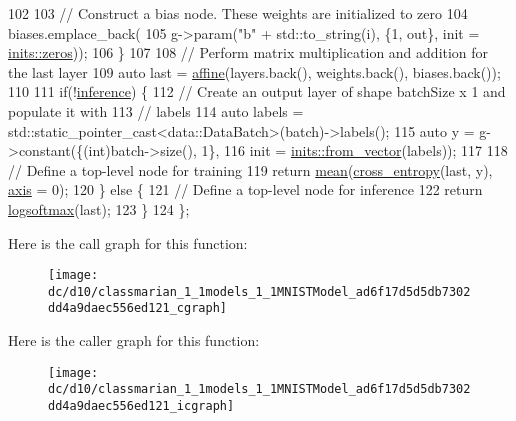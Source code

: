 \begin{DoxyCode}
102 
103       \textcolor{comment}{// Construct a bias node. These weights are initialized to zero}
104       biases.emplace\_back(
105           g->param(\textcolor{stringliteral}{"b"} + std::to\_string(i), \{1, out\}, init = \hyperlink{namespacemarian_1_1inits_a1bd34fd256e3df7bb1e27955a7f2b359}{inits::zeros}));
106     \}
107 
108     \textcolor{comment}{// Perform matrix multiplication and addition for the last layer}
109     \textcolor{keyword}{auto} last = \hyperlink{namespacemarian_aefe65d738dc9a0536f3a1f9346b8d47b}{affine}(layers.back(), weights.back(), biases.back());
110 
111     \textcolor{keywordflow}{if}(!\hyperlink{namespacemarian_1_1keywords_a7164ab5ae8f1206943787d0891d89735}{inference}) \{
112       \textcolor{comment}{// Create an output layer of shape batchSize x 1 and populate it with}
113       \textcolor{comment}{// labels}
114       \textcolor{keyword}{auto} labels = std::static\_pointer\_cast<data::DataBatch>(batch)->labels();
115       \textcolor{keyword}{auto} y = g->constant(\{(int)batch->size(), 1\},
116                            init = \hyperlink{namespacemarian_1_1inits_ab9566318ddbacd376c74cdbdfac091e4}{inits::from\_vector}(labels));
117 
118       \textcolor{comment}{// Define a top-level node for training}
119       \textcolor{keywordflow}{return} \hyperlink{namespacemarian_a15ec9743709e47180378db974ddbf116}{mean}(\hyperlink{namespacemarian_a37652ca2a00f3c36816fe5fec28104a0}{cross\_entropy}(last, y), \hyperlink{namespacemarian_1_1keywords_ace9158eabbddaca833133f12da98b9d6}{axis} = 0);
120     \} \textcolor{keywordflow}{else} \{
121       \textcolor{comment}{// Define a top-level node for inference}
122       \textcolor{keywordflow}{return} \hyperlink{namespacemarian_a471a2cbd15b4094528a1643abc814bb6}{logsoftmax}(last);
123     \}
124   \};
\end{DoxyCode}


Here is the call graph for this function\+:
\nopagebreak
\begin{figure}[H]
\begin{center}
\leavevmode
\texttt{[image: dc/d10/classmarian\_1\_1models\_1\_1MNISTModel\_ad6f17d5d5db7302dd4a9daec556ed121\_cgraph]}
\end{center}
\end{figure}




Here is the caller graph for this function\+:
\nopagebreak
\begin{figure}[H]
\begin{center}
\leavevmode
\texttt{[image: dc/d10/classmarian\_1\_1models\_1\_1MNISTModel\_ad6f17d5d5db7302dd4a9daec556ed121\_icgraph]}
\end{center}
\end{figure}


